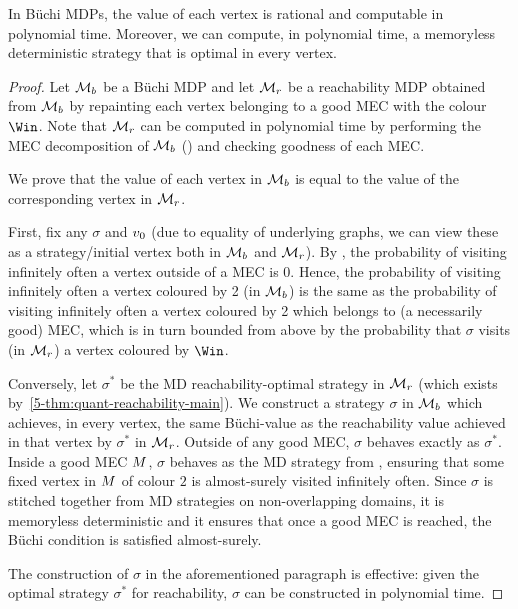 \begin{theorem}
\label{5-thm:quant-buchi}
In B{\"u}chi MDPs, the value of each vertex is rational and computable in polynomial time. Moreover, we can compute, in polynomial time, a memoryless deterministic strategy that is optimal in every vertex.
\end{theorem}
\begin{proof}
Let $\mathcal{M}_b$ be a B{\"u}chi MDP and let $\mathcal{M}_r$ be a reachability MDP obtained from $\mathcal{M}_b$ by repainting each vertex belonging to a good MEC with the colour $\Win$. Note that $\mathcal{M}_r$ can be computed in polynomial time by performing the MEC decomposition of $\mathcal{M}_b$ () and checking goodness of each MEC.

We prove that the value of each vertex in $\mathcal{M}_b$ is equal to the value of the corresponding vertex in $\mathcal{M}_r$.

First, fix any $\sigma$ and $v_0$ (due to equality of underlying graphs, we can view these as a strategy/initial vertex both in $\mathcal{M}_b$ and $\mathcal{M}_r$). By , the probability of visiting infinitely often a vertex outside of a MEC is 0. Hence, the probability of visiting infinitely often a vertex coloured by 2 (in $\mathcal{M}_b$) is the same as the probability of visiting infinitely often a vertex coloured by 2 which belongs to (a necessarily good) MEC, which is in turn bounded from above by the probability that $\sigma$ visits (in $\mathcal{M}_r$) a vertex coloured by $\Win$.

Conversely, let $\sigma^*$ be the MD reachability-optimal strategy in $\mathcal{M}_r$ (which exists by~\cref{5-thm:quant-reachability-main}). We construct a strategy $\sigma$ in $\mathcal{M}_b$ which achieves, in every vertex, the same B{\"u}chi-value as the reachability value achieved in that vertex by $\sigma^*$ in $\mathcal{M}_r$. Outside of any good MEC, $\sigma$ behaves exactly as $\sigma^*$. Inside a good MEC $M$, $\sigma$ behaves as the MD strategy from , ensuring that some fixed vertex in $M$ of colour $2$ is almost-surely visited infinitely often. Since $\sigma$ is stitched together from MD strategies on non-overlapping domains, it is memoryless deterministic and it ensures that once a good MEC is reached, the B{\"u}chi condition is satisfied almost-surely.

The construction of $\sigma$ in the aforementioned paragraph is effective: given the optimal strategy $\sigma^*$ for reachability, $\sigma$ can be constructed in polynomial time.
\end{proof}

